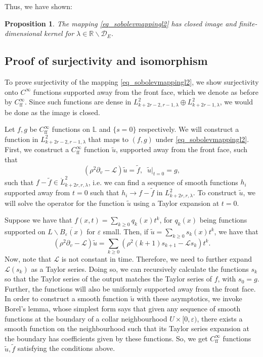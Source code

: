 \documentclass[10pt, a4paper]{article}
\theoremstyle{plain}%
\newtheorem{prop}[theorem]{Proposition}
\theoremstyle{definition}
\numberwithin{figure}{section}
\numberwithin{equation}{section}
\newcommand{\bR}{\mathbb{R}}
\newcommand{\tu}{\tilde{u}}
\newcommand{\ep}{\varepsilon}
\newcommand{\ff}{\mathrm{ff}}
\newcommand{\cD}{\mathcal{D}}
\begin{document}
Thus, we have shown:
\begin{prop}
	The mapping \eqref{eq_sobolevmappingl2} has closed image and finite-dimensional kernel for $\lambda\in \bR\backslash \cD_E$.
\end{prop}

\subsection{Proof of surjectivity and isomorphism}

To prove surjectivity of the mapping \eqref{eq_sobolevmappingl2}, we show surjectivity onto $C^\infty$ functions supported away from the front face, which we denote as before by $C^\infty_{\ff}$. Since such functions are dense in $L^2_{k+2r-2,r-1,\lambda}\oplus L^2_{k+2r-1,\lambda}$, we would be done as the image is closed.

Let $f,g$ be $C^\infty_{\ff}$ functions on $\mathbb{L}$ and $\{s =0\}$ respectively. We will construct a function in $L^2_{k+2r-2,r-1,\lambda}$ that maps to $(f,g)$ under \eqref{eq_sobolevmappingl2}. First, we construct a $C^\infty_\ff$ function $\tilde{u}$, supported away from the front face, such that \[
(\rho^2\partial_v - \mathcal{L})\tilde{u}=\tilde{f}, \;\; \tilde{u}|_{t=0} = g,
\]
such that $f-\tilde{f} \in \mathring{L}^2_{k+2r,r,\lambda}$, i.e. we can find a sequence of smooth functions $h_i$ supported away from $t=0$ such that $h_i \rightarrow f - \tilde{f} $ in $L^2_{k+2r,r,\lambda}$. To construct $\tilde{u}$, we will solve the operator for the function $\tilde{u}$ using a Taylor expansion at $t=0$. 

Suppose we have that $f(x,t) = \sum_{k\geq 0} q_k(x)t^k$, for $q_k(x)$ being functions supported on $L\backslash \overline{B_\ep(x)}$ for $\ep$ small. Then, if $\tilde{u} = \sum_{k\geq 0} s_k(x)t^k$, we have that \[
(\rho^2\partial_v  - \mathcal{L})\tilde{u} = \sum_{k\geq 0 } (\rho^2(k+1) s_{k+1} - \mathcal{L}s_k)t^k. 
\]
Now, note that $\mathcal{L}$ is not constant in time. Therefore, we need to further expand $\mathcal{L}(s_k)$ as a Taylor series. Doing so, we can recursively calculate the functions $s_k$ so that the Taylor series of the output matches the Taylor series of $f$, with $s_0 = g$. Further, the functions will also be uniformly supported away from the front face.  In order to construct a smooth function $\tu$ with these asymptotics, we invoke Borel's lemma, whose simplest form says that given any sequence of smooth functions at the boundary of a collar neighbourhood $U\times [0,\ep)$, there exists a smooth function on the neighbourhood such that its Taylor series expansion at the boundary has coefficients given by these functions. So, we get $C^\infty_\ff$ functions $\tu,\tilde{f}$ satisfying the conditions above.
\end{document}
